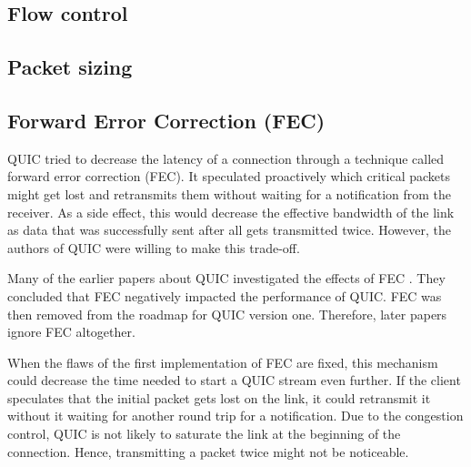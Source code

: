 \documentclass[conference]{IEEEtran}
\begin{document}

\subsection{Flow control}

\subsection{Packet sizing}
% 

\subsection{Forward Error Correction (FEC)}

QUIC tried to decrease the latency of a connection through a technique called forward error correction (FEC). It speculated proactively which critical packets might get lost and retransmits them without waiting for a notification from the receiver. As a side effect, this would decrease the effective bandwidth of the link as data that was successfully sent after all gets transmitted twice. However, the authors of QUIC were willing to make this trade-off. 

Many of the earlier papers about QUIC investigated the effects of FEC \cite{HTTPoverUDP}. They concluded that FEC negatively impacted the performance of QUIC. FEC was then removed from the roadmap for QUIC version one. Therefore, later papers ignore FEC altogether.

When the flaws of the first implementation of FEC are fixed, this mechanism could decrease the time needed to start a QUIC stream even further. If the client speculates that the initial packet gets lost on the link, it could retransmit it without it waiting for another round trip for a notification. Due to the congestion control, QUIC is not likely to saturate the link at the beginning of the connection. Hence, transmitting a packet twice might not be noticeable.
\end{document}
